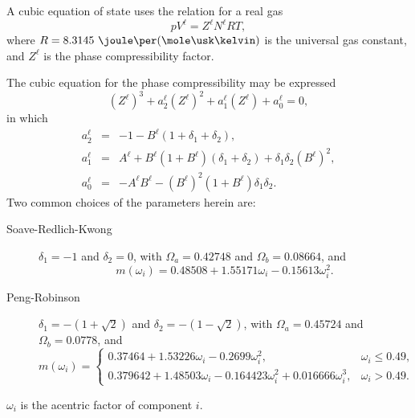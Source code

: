 

A cubic equation of state uses the relation for a real gas
\begin{equation}
  p V^\ell = Z^\ell N^\ell R T,
\end{equation}
where $R=8.3145\ \joule\per(\mole\usk\kelvin)$ is the universal gas
constant, and $Z^\ell$ is the phase compressibility factor.

The cubic equation for the phase compressibility may be expressed
\begin{equation}
  (Z^\ell)^3 + a_2^\ell (Z^\ell)^2 + a_1^\ell (Z^\ell) + a_0^\ell = 0,
\end{equation}
in which
\begin{eqnarray}
  a_2^\ell & = & -1 - B^\ell (1+\delta_1+\delta_2), \\
  a_1^\ell & = & A^\ell + B^\ell
  \left( 1 + B^\ell \right) \left(\delta_1 + \delta_2\right) +
  \delta_1\delta_2 \left(B^\ell\right)^2, \\
  a_0^\ell & = & - A^\ell B^\ell - \left(B^\ell\right)^2
  \left( 1 + B^\ell \right)\delta_1\delta_2.
\end{eqnarray}
Two common choices of the parameters herein are:
\begin{description}
\item[Soave-Redlich-Kwong] $\delta_1=-1$ and $\delta_2=0$, with
  $\Omega_a=0.42748$ and $\Omega_b=0.08664$, and
  \begin{equation}
    m(\omega_i) = 0.48508 + 1.55171 \omega_i - 0.15613 \omega_i^2.
  \end{equation}
\item[Peng-Robinson] $\delta_1=-(1+\sqrt{2})$ and
  $\delta_2=-(1-\sqrt{2})$, with $\Omega_a=0.45724$ and
  $\Omega_b=0.0778$, and
  \begin{equation}
    m(\omega_i) = \left\{
      \begin{array}{ll}
        0.37464 + 1.53226 \omega_i - 0.2699 \omega_i^2, & \omega_i
        \leq 0.49, \\
        0.379642 + 1.48503 \omega_i - 0.164423 \omega_i^2 + 0.016666
        \omega_i^3, & \omega_i > 0.49.
      \end{array}
    \right.
  \end{equation}
\end{description}
$\omega_i$ is the acentric factor of component $i$.


